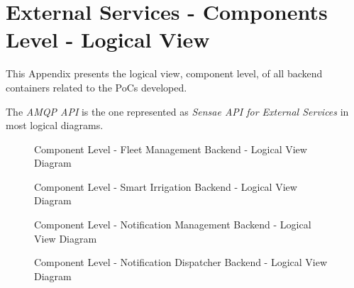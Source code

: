 \chapter{External Services - Components Level - Logical View}
\label{AppendixC2}

This Appendix presents the logical view, component level, of all backend containers related to the \gls{PoC}s developed.

The \textit{AMQP API} is the one represented as \textit{Sensae API for External Services} in most logical diagrams.

\begin{figure}[H]
   \centering
   \resizebox{0.8\columnwidth}{!}
   {
      
   }
   \caption[Component Level - Fleet Management Backend - Logical View Diagram]{Component Level - Fleet Management Backend - Logical View Diagram}
   \label{fig:AppendixC2:fleet}
\end{figure}

\begin{figure}[H]
   \centering
   \resizebox{\columnwidth}{!}
   {
      
   }
   \caption[Component Level - Smart Irrigation Backend - Logical View Diagram]{Component Level - Smart Irrigation Backend - Logical View Diagram}
   \label{fig:AppendixC2:irrig}
\end{figure}

\begin{figure}[H]
   \centering
   \resizebox{\columnwidth}{!}
   {
      
   }
   \caption[Component Level - Notification Management Backend - Logical View Diagram]{Component Level - Notification Management Backend - Logical View Diagram}
   \label{fig:AppendixC2:noti}
\end{figure}

\begin{figure}[H]
   \centering
   \resizebox{\columnwidth}{!}
   {
      
   }
   \caption[Component Level - Notification Dispatcher Backend - Logical View Diagram]{Component Level - Notification Dispatcher Backend - Logical View Diagram}
   \label{fig:AppendixC2:notidispatcher}
\end{figure}
